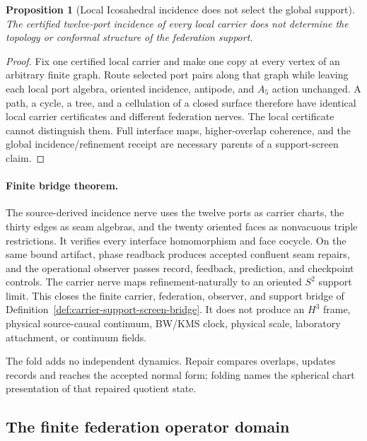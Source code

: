 \documentclass[11pt]{article}
\newtheorem{proposition}[theorem]{Proposition}
\theoremstyle{remark}
\theoremstyle{plain}
\begin{document}
\begin{proposition}[Local Icosahedral incidence does not select the global support]
The certified twelve-port incidence of every local carrier does not determine the topology or
conformal structure of the federation support.
\end{proposition}

\begin{proof}
Fix one certified local carrier and make one copy at every vertex of an arbitrary finite graph.
Route selected port pairs along that graph while leaving each local port algebra, oriented
incidence, antipode, and \(A_5\) action unchanged. A path, a cycle, a tree, and a cellulation of a
closed surface therefore have identical local carrier certificates and different federation
nerves. The local certificate cannot distinguish them. Full interface maps, higher-overlap
coherence, and the global incidence/refinement receipt are necessary parents of a support-screen
claim.
\end{proof}

\paragraph{Finite bridge theorem.}
The source-derived incidence nerve uses the twelve ports as carrier charts,
the thirty edges as seam algebras, and the twenty oriented faces as
nonvacuous triple restrictions. It verifies every interface homomorphism and
face cocycle. On the same bound artifact, phase readback produces accepted
confluent seam repairs, and the operational observer passes record, feedback,
prediction, and checkpoint controls. The carrier nerve maps
refinement-naturally to an oriented \(S^2\) support limit. This closes the
finite carrier, federation, observer, and support bridge of
Definition~\ref{def:carrier-support-screen-bridge}. It does not produce an
\(H^3\) frame, physical source-causal continuum, BW/KMS clock, physical scale, laboratory
attachment, or continuum fields.



The fold adds no independent dynamics. Repair compares overlaps, updates
records and reaches the accepted normal form; folding names the spherical
chart presentation of that repaired quotient state.

\subsection{The finite federation operator domain}
\label{sec:finite-local-action-domain}
\end{document}
